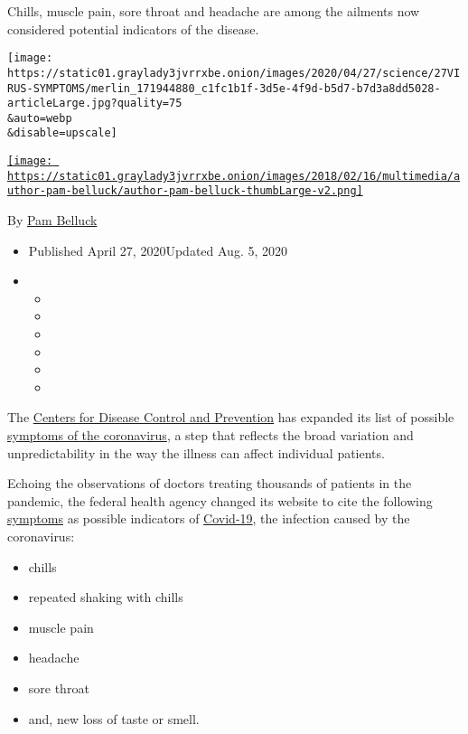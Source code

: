 Chills, muscle pain, sore throat and headache are among the ailments now
considered potential indicators of the disease.

\texttt{[image: https://static01.graylady3jvrrxbe.onion/images/2020/04/27/science/27VIRUS-SYMPTOMS/merlin\_171944880\_c1fc1b1f-3d5e-4f9d-b5d7-b7d3a8dd5028-articleLarge.jpg?quality=75\\\&auto=webp\\\&disable=upscale]}

\href{https://www.nytimes3xbfgragh.onion/by/pam-belluck}{\texttt{[image: https://static01.graylady3jvrrxbe.onion/images/2018/02/16/multimedia/author-pam-belluck/author-pam-belluck-thumbLarge-v2.png]}}

By \href{https://www.nytimes3xbfgragh.onion/by/pam-belluck}{Pam Belluck}

\begin{itemize}
\item
  Published April 27, 2020Updated Aug. 5, 2020
\item
  \begin{itemize}
  \item
  \item
  \item
  \item
  \item
  \item
  \end{itemize}
\end{itemize}

The
\href{https://www.nytimes3xbfgragh.onion/2020/05/07/us/politics/trump-cdc.html}{Centers
for Disease Control and Prevention} has expanded its list of possible
\href{https://www.nytimes3xbfgragh.onion/interactive/2020/08/05/well/covid-19-symptoms.html}{symptoms
of the coronavirus}, a step that reflects the broad variation and
unpredictability in the way the illness can affect individual patients.

Echoing the observations of doctors treating thousands of patients in
the pandemic, the federal health agency changed its website to cite the
following
\href{https://www.nytimes3xbfgragh.onion/article/coronavirus-symptoms.html}{symptoms}
as possible indicators of
\href{https://www.nytimes3xbfgragh.onion/2020/05/07/us/politics/trump-cdc.html}{Covid-19},
the infection caused by the coronavirus:

\begin{itemize}
\item
  chills
\item
  repeated shaking with chills
\item
  muscle pain
\item
  headache
\item
  sore throat
\item
  and, new loss of taste or smell.
\end{itemize}

